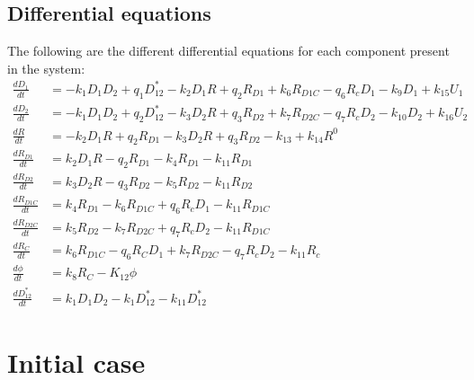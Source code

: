 \documentclass[10pt]{article}
\begin{document}
\subsection{Differential equations}
The following are the different differential equations for each component present in the system: 
\begin{subequations}
	\begin{align}\label{eq:model}
	\frac{dD_1}{dt} &= -k_1D_1D_2+q_1D^*_{12}-k_2D_1R+q_2R_{D1}+k_6R_{D1C}-q_6R_cD_1-k_9D_1+k_{15}U_1\\
	\frac{dD_2}{dt} &= -k_1D_1D_2+q_2D^*_{12}-k_3D_2R+q_3R_{D2}+k_7R_{D2C}-q_7R_cD_2-k_{10}D_2+k_{16}U_2\\
	\frac{dR}{dt} &= -k_2D_1R+q_2R_{D1}-k_3D_2R+q_3R_{D2}-k_{13}+k_{14}R^0\\
	\frac{dR_{D1}}{dt} &= k_2D_1R-q_2R_{D1}-k_4R_{D1}-k_{11}R_{D1}\\
	\frac{dR_{D2}}{dt} &= k_3D_2R-q_3R_{D2}-k_5R_{D2}-k_{11}R_{D2}\\
	\frac{dR_{D1C}}{dt} &= k_4R_{D1}-k_6R_{D1C}+q_6R_cD_1-k_{11}R_{D1C}\\
	\frac{dR_{D2C}}{dt} &= k_5R_{D2}-k_7R_{D2C}+q_7R_cD_2-k_{11}R_{D1C}\\
	\frac{dR_C}{dt} &= k_6R_{D1C}-q_6R_CD_1+k_7R_{D2C}-q_7R_cD_2-k_{11}R_c\\
	\frac{d \phi}{dt} &= k_8R_C-K_{12}\phi \\
	\frac{dD^*_{12}}{dt} &= k_1D_1D_2-k_1D^*_{12}-k_{11}D^*_{12}
	\end{align}
\end{subequations}
\newpage
\section{Initial case}
\end{document}
